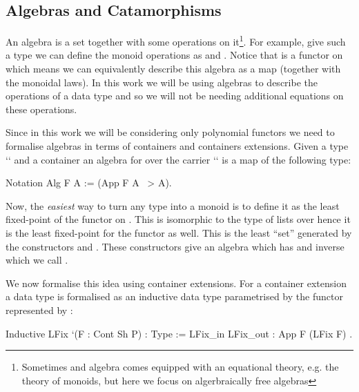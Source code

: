 \documentclass[anonymous, a4paper, UKenglish, cleveref, autoref, thm-restate]{lipics-v2021}
\begin{document}
\subsection{Algebras and Catamorphisms}
\label{sec:algebras} An algebra is a set  together with some operations
on it\footnote[1]{Sometimes and algebra comes equipped with an equational
theory, e.g. the theory of monoids, but here we focus on algerbraically free
algebras}.  For example, give such a type  we can define the monoid
operations as  and . Notice
that  is a functor on  which means we can equivalently
describe this algebra as a map  (together with the
monoidal laws).  In this work we will be using algebras to describe the
operations of a data type and so we will not be needing additional equations on
these operations.

Since in this work we will be considering only polynomial functors we need to
formalise algebras in terms of containers and containers extensions. Given a
type `` and a container  an algebra for  over the carrier
`` is a map of the following type:
\begin{coqcode}
Notation Alg F A := (App F A ~> A).
\end{coqcode}

Now, the \emph{easiest} way to turn any type  into a monoid is to define
it as the least fixed-point of the functor  on .
This is isomorphic to the type of lists over  hence it is the least
fixed-point for the functor  as well. This is the least
``set'' generated by the constructors 
and . These constructors give an
algebra  which has and inverse which
we  call .

We now formalise this idea using container extensions.  For a container
extension a data type is formalised as an inductive data type parametrised by
the functor represented by :
\begin{coqcode}
Inductive LFix `(F : Cont Sh P) : Type := LFix_in { LFix_out : App F (LFix F) }.
\end{coqcode}
\end{document}
